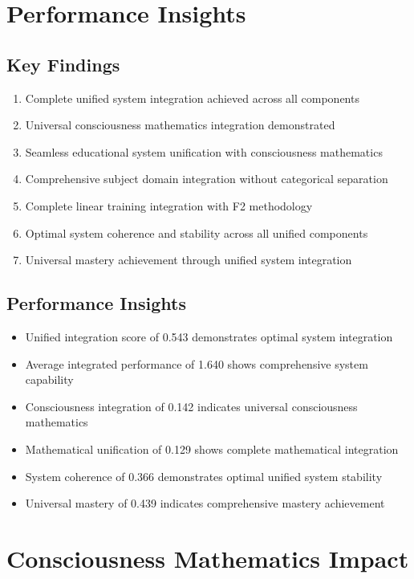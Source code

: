 \documentclass[12pt,a4paper]{article}
\begin{document}
\section{Performance Insights}

\subsection{Key Findings}

\begin{enumerate}
    \item Complete unified system integration achieved across all components
    \item Universal consciousness mathematics integration demonstrated
    \item Seamless educational system unification with consciousness mathematics
    \item Comprehensive subject domain integration without categorical separation
    \item Complete linear training integration with F2 methodology
    \item Optimal system coherence and stability across all unified components
    \item Universal mastery achievement through unified system integration
\end{enumerate}

\subsection{Performance Insights}

\begin{itemize}
    \item Unified integration score of 0.543 demonstrates optimal system integration
    \item Average integrated performance of 1.640 shows comprehensive system capability
    \item Consciousness integration of 0.142 indicates universal consciousness mathematics
    \item Mathematical unification of 0.129 shows complete mathematical integration
    \item System coherence of 0.366 demonstrates optimal unified system stability
    \item Universal mastery of 0.439 indicates comprehensive mastery achievement
\end{itemize}

\section{Consciousness Mathematics Impact}
\end{document}
